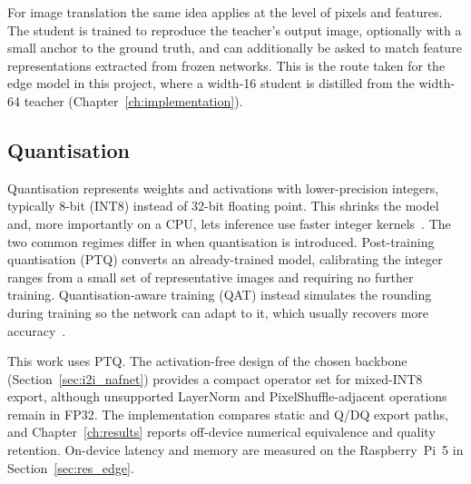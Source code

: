 For image translation the same idea applies at the level of pixels and features. The student is trained to reproduce the teacher's output image, optionally with a small anchor to the ground truth, and can additionally be asked to match feature representations extracted from frozen networks. This is the route taken for the edge model in this project, where a width-16 student is distilled from the width-64 teacher (Chapter~\ref{ch:implementation}).

\subsection{Quantisation}
\label{sec:quantisation}

Quantisation represents weights and activations with lower-precision integers, typically 8-bit (INT8) instead of 32-bit floating point. This shrinks the model and, more importantly on a CPU, lets inference use faster integer kernels~\cite{jacob2018quantization,gholami2021survey}. The two common regimes differ in when quantisation is introduced. Post-training quantisation (PTQ) converts an already-trained model, calibrating the integer ranges from a small set of representative images and requiring no further training. Quantisation-aware training (QAT) instead simulates the rounding during training so the network can adapt to it, which usually recovers more accuracy~\cite{jacob2018quantization}.

This work uses PTQ. The activation-free design of the chosen backbone (Section~\ref{sec:i2i_nafnet}) provides a compact operator set for mixed-INT8 export, although unsupported LayerNorm and PixelShuffle-adjacent operations remain in FP32. The implementation compares static and Q/DQ export paths, and Chapter~\ref{ch:results} reports off-device numerical equivalence and quality retention. On-device latency and memory are measured on the Raspberry~Pi~5 in Section~\ref{sec:res_edge}.
